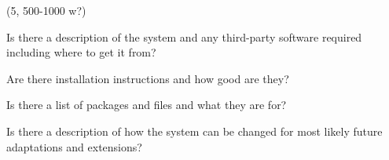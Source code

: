 (5, 500-1000 w?)

Is there a description of the system and any third-party software required
including where to get it from?

Are there installation instructions and how good are they?

Is there a list of packages and files and what they are for?

Is there a description of how the system can be changed for most likely future
adaptations and extensions?
